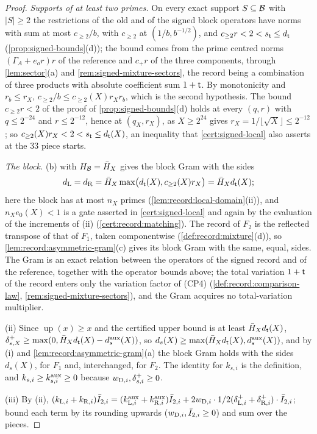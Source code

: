 \begin{proof}
\emph{Supports of at least two primes.} On every exact support $S\subseteq\Blk$
with $|S|\ge2$ the restrictions of the old and of the signed block operators
have norms with sum at most $c_{\ge2}/b$, with $c_{\ge2}$ at $(1/b,b^{-1/2})$, and
$c_{\ge2}r<2<s_\tlaw\le d_\tlaw$ (\cref{prop:signed-bounds}(d)); the bound comes from the
prime centred norms $(\Gamma_A+e_or)r$ of the reference and $c_+r$ of the three
components, through \cref{lem:sector}(a) and \cref{rem:signed-mixture-sectors},
the record being a combination of three products with absolute coefficient sum
$1+\tlaw$. By monotonicity and $r_b\le r_X$, $c_{\ge2}/b\le c_{\ge2}(X)r_Xr_b$, which is
the second hypothesis. The bound $c_{\ge2}r<2$ of the proof of
\cref{prop:signed-bounds}(d) holds at every $(q,r)$ with $q\le2^{-24}$ and
$r\le2^{-12}$, hence at $(q_X,r_X)$, as $X\ge2^{24}$ gives
$r_X=1/\lfloor\sqrt X\rfloor\le2^{-12}$; so $c_{\ge2}(X)r_X<2<s_\tlaw\le d_\tlaw(X)$, an
inequality that \cref{cert:signed-local} also asserts at the $33$ piece starts.

\emph{The block.} (b) with $H_\Blk=\bar H_X$
gives the block Gram with the sides
\[
 d_{\rm L}=d_{\rm R}=\bar H_X\max\bigl(d_\tlaw(X),c_{\ge2}(X)r_X\bigr)=\bar H_Xd_\tlaw(X);
\]
here the block has at most $n_X$ primes
(\cref{lem:record:local-domain}(ii)), and $n_Xe_0(X)<1$ is a gate asserted in
\cref{cert:signed-local} and again by the evaluation of the increments of (ii)
(\cref{cert:record:matching}). The record of $F_2$ is the reflected transpose of
that of $F_1$, taken componentwise (\cref{def:record:mixture}(d)), so
\cref{lem:record:asymmetric-gram}(c) gives its block Gram with the same, equal,
sides. The Gram is an exact relation between the operators of the signed record
and of the reference, together with the operator bounds above; the total
variation $1+\tlaw$ of the record enters only the variation factor of (CP4)
(\cref{def:record:comparison-law}, \cref{rem:signed-mixture-sectors}), and the
Gram acquires no total-variation multiplier.

(ii) Since $\operatorname{up}(x)\ge x$ and the certified upper bound is at least
$\bar H_Xd_\tlaw(X)$, $\delta^+_{s,X}\ge\max(0,\bar H_Xd_\tlaw(X)-d^{\rm aux}_s(X))$, so
$d_s(X)\ge\max(\bar H_Xd_\tlaw(X),d^{\rm aux}_s(X))$, and by (i) and
\cref{lem:record:asymmetric-gram}(a) the block Gram holds with the sides $d_s(X)$,
for $F_1$ and, interchanged, for $F_2$. The identity for $k_{s,i}$ is the
definition, and $k_{s,i}\ge k^{\rm aux}_{s,i}\ge0$ because
$w_{{\rm D},i},\delta^+_{s,i}\ge0$.

(iii) By (ii), $(k_{{\rm L},i}+k_{{\rm R},i})\bar I_{2,i}=(k^{\rm aux}_{{\rm L},i}
+k^{\rm aux}_{{\rm R},i})\bar I_{2,i}+2w_{{\rm D},i}\cdot\frac12(\delta^+_{{\rm L},i}
+\delta^+_{{\rm R},i})\cdot\bar I_{2,i}$; bound each term by its rounding upwards
($w_{{\rm D},i},\bar I_{2,i}\ge0$) and sum over the pieces.
\end{proof}

